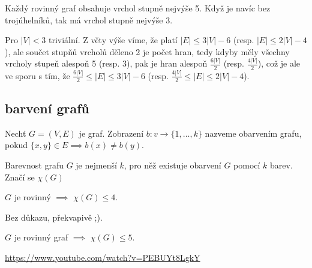 \documentclass[12pt]{article}					%
\begin{document}
    \begin{veta}
        Každý rovinný graf obsahuje vrchol stupně nejvýše 5. Když je navíc bez trojúhelníků, tak má vrchol stupně nejvýše 3.

        \begin{dukazin}
                Pro $|V| < 3$ triviální. Z věty výše víme, že platí $|E| ≤ 3|V| - 6$ (resp. $|E| ≤ 2|V| - 4$), ale součet stupňů vrcholů děleno 2 je počet hran, tedy kdyby měly všechny vrcholy stupeň alespoň 5 (resp. 3), pak je hran alespoň $\frac{6|V|}{2}$ (resp. $\frac{4|V|}{2}$), což je ale ve sporu s tím, že $\frac{6|V|}{2}≤|E|≤3|V|-6$ (resp. $\frac{4|V|}{2} ≤ |E| ≤ 2|V| - 4$).
        \end{dukazin}
    \end{veta}

    \subsection{barvení grafů}
        \begin{definice}
            Nechť $G = (V, E)$ je graf. Zobrazení $b:v \rightarrow \{1, …, k\}$ nazveme obarvením grafu, pokud $\{x, y\} \in E \implies b(x)≠b(y)$.

            Barevnost grafu $G$ je nejmenší $k$, pro něž existuje obarvení $G$ pomocí $k$ barev. Značí se $\chi(G)$
        \end{definice}

        \begin{veta}[O 4 barvách]
            $G$ je rovinný $\implies$ $\chi(G) ≤ 4$.

            \begin{dukazin}
                Bez důkazu, překvapivě ;).
            \end{dukazin}
        \end{veta}

        \begin{veta}[O 5 barvách]
            $G$ je rovinný graf $\implies$ $\chi(G) ≤ 5$.

            \begin{dukazin}
                \url{https://www.youtube.com/watch?v=PEBUYt8LgkY}
            \end{dukazin}
        \end{veta}
\end{document}
